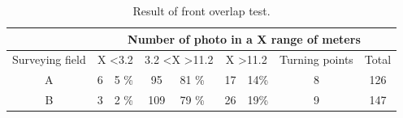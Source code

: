 \begin{table}[H]
\centering
\begin{tabular}{|c|c|l|c|l|c|l|c|c|}
\hline
 & \multicolumn{8}{c|}{Number of photo in a X range of meters}                                                                                                                            \\ \hline
Surveying field         & \multicolumn{2}{c|}{X \textless 3.2} & \multicolumn{2}{c|}{3.2 \textless X \textgreater 11.2} & \multicolumn{2}{c|}{X \textgreater 11.2} & Turning points & Total                      \\ \hline
A                       & 6               & 5 \%               & 95                        & 81 \%                      & 17                 & 14\%                & 8              & 126                        \\ \hline
B                       & 3               & 2 \%                & 109                       & 79 \%                      & 26                 & 19\%                & 9              &  147 \\ \hline
\end{tabular}
\caption{Result of front overlap test.}
\label{Table:FrontOverlap} 
\end{table}
